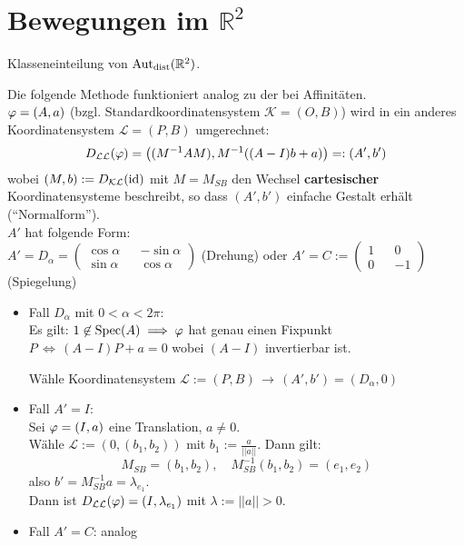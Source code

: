 \documentclass[parskip,a4paper,twoside,DIV15,BCOR12mm]{scrbook}
\begin{document}
\section{Bewegungen im $\mathbb{R}^2$}
\begin{task}
Klasseneinteilung von $\operatorname{Aut_{dist}}(\mathbb{R}^2)$.
\end{task}

\begin{method}
Die folgende Methode funktioniert analog zu der bei Affinitäten.\\ 
$\varphi=(A,a)$ (bzgl. Standardkoordinatensystem $\mathcal{K}=(O,B)$) wird in ein 
anderes Koordinatensystem $\mathcal{L}=(P,B)$ umgerechnet:
\[D_{\mathcal{L}\mathcal{L}}(\varphi)=\left((M^{-1}AM),M^{-1}((A-I)b+a)\right)=:(A',b')\]
wobei $(M,b):=D_{\mathcal{K}\mathcal{L}}(\operatorname{id})$ mit $M=M_{SB}$ den Wechsel \textbf{cartesischer}
Koordinatensysteme beschreibt, so dass \((A',b')\) einfache Gestalt erhält 
(``Normalform'').\\
\(A'\) hat folgende Form:\\
\(A'=D_{\alpha}=
\begin{pmatrix}
\cos\alpha&&-\sin\alpha\\
\sin\alpha&&\cos\alpha
\end{pmatrix}\) (Drehung) oder \(A'=C:=
\begin{pmatrix}
1&&0\\
0&&-1
\end{pmatrix}\) (Spiegelung)
\begin{itemize}
\item Fall \(D_{\alpha}\) mit \(0<\alpha <2\pi\):\\
Es gilt: \(1\not\in\operatorname{Spec}(A) \implies \varphi\) hat genau einen Fixpunkt 
\(P\,\Longleftrightarrow\,(A-I)P+a=0\) wobei \((A-I)\) invertierbar ist.

Wähle Koordinatensystem \(\mathcal{L}:=(P,B)\,\rightarrow\,(A',b')=(D_{\alpha},0)\)
\item Fall \(A'=I\):\\
Sei \(\varphi=(I,a)\) eine Translation, \(a\neq 0\).\\
Wähle \(\mathcal{L}:=(0,(b_{1},b_{2}))\) mit \(b_{1}:=\frac{a}{||a||}\). Dann
gilt:
\[
M_{SB} = (b_{1},b_{2}),\quad M_{SB}^{-1}(b_{1},b_{2})=(e_{1},e_{2})
\]
also \(b'=M_{SB}^{-1}a=\lambda_{e_{1}}\).\\
Dann ist \(D_{\mathcal{L}\mathcal{L}}(\varphi)=(I,\lambda_{e_{1}})\) mit 
\(\lambda:=||a||>0\).
\item Fall \(A'=C\): analog
\end{itemize}
\end{method}
\end{document}

